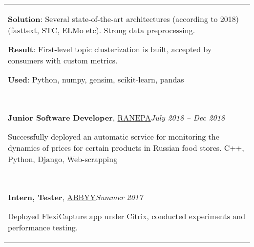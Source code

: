 \documentclass[a4paper,12pt]{memoir} %
\newcommand{\opendialog}{\bluebullet}
\newcommand{\bullitem}[1]{\opendialog #1}
\begin{document}
\begin{tabular}{p{} }
		\textbf{Solution}: Several state-of-the-art architectures (according to 2018) (fasttext, STC, ELMo etc). Strong data preprocessing.
		
		\textbf{Result}:  First-level topic clusterization is built, accepted by consumers with custom metrics.
		
		\textbf{Used}: Python, numpy,  gensim, scikit-learn, pandas
		
		
		~
		
		\SepSep
		\bullitem{\textbf{Junior Software Developer}, \href{https://www.ranepa.ru/eng/}{RANEPA}}\hfill\emph{July 2018 -- Dec 2018}
		
		Successfully deployed an automatic service for monitoring the dynamics of prices for certain products in Russian food stores. C++, Python, Django, Web-scrapping
		
		~

		

		\SepSep
		\bullitem{\textbf{Intern, Tester}, \href{https://www.abbyy.com/en-eu/}{ABBYY}}\hfill\emph{Summer 2017} 
		
		Deployed FlexiCapture app under Citrix, conducted experiments and performance testing.
	\end{tabular}
	
	\vspace{0.9em}
	
	\newpage 
	
\end{document}
